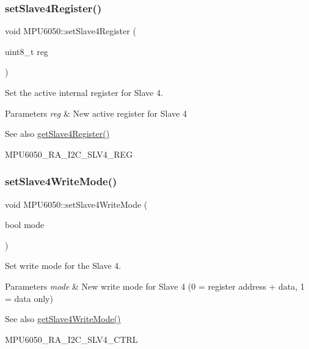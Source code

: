 \subsubsection{\texorpdfstring{setSlave4Register()}{setSlave4Register()}}
{\footnotesize\ttfamily void M\+P\+U6050\+::set\+Slave4\+Register (\begin{DoxyParamCaption}\item[{uint8\+\_\+t}]{reg }\end{DoxyParamCaption})}

Set the active internal register for Slave 4. 
\begin{DoxyParams}{Parameters}
{\em reg} & New active register for Slave 4 \\
\hline
\end{DoxyParams}
\begin{DoxySeeAlso}{See also}
\mbox{\hyperlink{class_m_p_u6050_a7bd548cb60ecceb27c72f026ec0a60f8}{get\+Slave4\+Register()}} 

M\+P\+U6050\+\_\+\+R\+A\+\_\+\+I2\+C\+\_\+\+S\+L\+V4\+\_\+\+R\+EG 
\end{DoxySeeAlso}
\mbox{\label{class_m_p_u6050_af1402fe7f3e1cc0dedb6714351cbca4e}} 
\subsubsection{\texorpdfstring{setSlave4WriteMode()}{setSlave4WriteMode()}}
{\footnotesize\ttfamily void M\+P\+U6050\+::set\+Slave4\+Write\+Mode (\begin{DoxyParamCaption}\item[{bool}]{mode }\end{DoxyParamCaption})}

Set write mode for the Slave 4. 
\begin{DoxyParams}{Parameters}
{\em mode} & New write mode for Slave 4 (0 = register address + data, 1 = data only) \\
\hline
\end{DoxyParams}
\begin{DoxySeeAlso}{See also}
\mbox{\hyperlink{class_m_p_u6050_a8d5a5e73907c78960154b92656127372}{get\+Slave4\+Write\+Mode()}} 

M\+P\+U6050\+\_\+\+R\+A\+\_\+\+I2\+C\+\_\+\+S\+L\+V4\+\_\+\+C\+T\+RL 
\end{DoxySeeAlso}
\mbox{\label{class_m_p_u6050_a3c07eb2c59fff3ddc7186319ee40ba6f}} 
